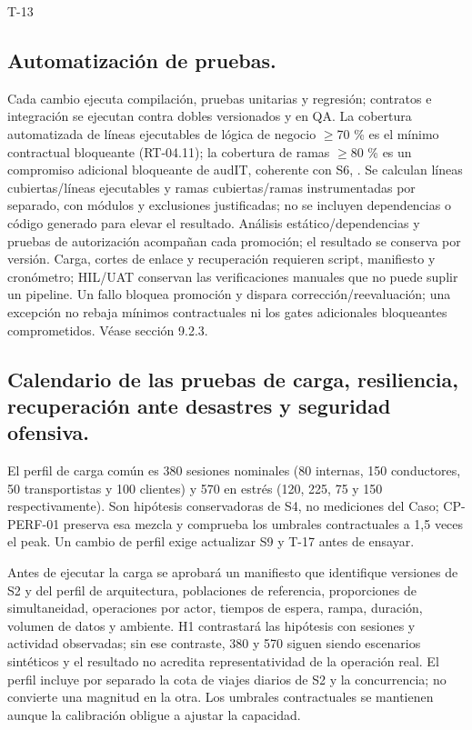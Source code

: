 \begin{formulario}{T-13}
\subsection*{Automatización de pruebas.}\label{sec:9-t13-4}
Cada cambio ejecuta compilación, pruebas unitarias y regresión; contratos e integración se ejecutan contra dobles versionados y en QA. La cobertura automatizada de líneas ejecutables de lógica de negocio \(\ge\)70 \% es el mínimo contractual bloqueante (RT-04.11); la cobertura de ramas \(\ge\)80 \% es un compromiso adicional bloqueante de audIT, coherente con S6, . Se calculan líneas cubiertas/líneas ejecutables y ramas cubiertas/ramas instrumentadas por separado, con módulos y exclusiones justificadas; no se incluyen dependencias o código generado para elevar el resultado. Análisis estático/dependencias y pruebas de autorización acompañan cada promoción; el resultado se conserva por versión. Carga, cortes de enlace y recuperación requieren script, manifiesto y cronómetro; HIL/UAT conservan las verificaciones manuales que no puede suplir un pipeline. Un fallo bloquea promoción y dispara corrección/reevaluación; una excepción no rebaja mínimos contractuales ni los gates adicionales bloqueantes comprometidos. Véase sección 9.2.3.

\subsection*{Calendario de las pruebas de carga, resiliencia, recuperación ante desastres y seguridad ofensiva.}\label{sec:9-t13-5}
El perfil de carga común es 380 sesiones nominales (80 internas, 150 conductores, 50 transportistas y 100 clientes) y 570 en estrés (120, 225, 75 y 150 respectivamente). Son hipótesis conservadoras de S4, no mediciones del Caso; CP-PERF-01 preserva esa mezcla y comprueba los umbrales contractuales a 1,5 veces el peak. Un cambio de perfil exige actualizar S9 y T-17 antes de ensayar.

Antes de ejecutar la carga se aprobará un manifiesto que identifique versiones de S2 y del perfil de arquitectura, poblaciones de referencia, proporciones de simultaneidad, operaciones por actor, tiempos de espera, rampa, duración, volumen de datos y ambiente. H1 contrastará las hipótesis con sesiones y actividad observadas; sin ese contraste, 380 y 570 siguen siendo escenarios sintéticos y el resultado no acredita representatividad de la operación real. El perfil incluye por separado la cota de viajes diarios de S2 y la concurrencia; no convierte una magnitud en la otra. Los umbrales contractuales se mantienen aunque la calibración obligue a ajustar la capacidad.


\end{formulario}
